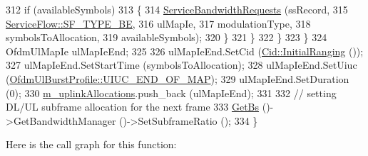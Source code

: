 \begin{DoxyCode}
312               \textcolor{keywordflow}{if} (availableSymbols)
313                 \{
314                   \hyperlink{classns3_1_1UplinkSchedulerSimple_ad420cfa439ba7c319fab7dd0db299408}{ServiceBandwidthRequests} (ssRecord,
315                                             \hyperlink{classns3_1_1ServiceFlow_a7990ba10be1e098328fd1e6382a26235af93a8bd8fce654e688f957f6f362e5c7}{ServiceFlow::SF\_TYPE\_BE},
316                                             ulMapIe,
317                                             modulationType,
318                                             symbolsToAllocation,
319                                             availableSymbols);
320                 \}
321             \}
322         \}
323     \}
324   OfdmUlMapIe ulMapIeEnd;
325 
326   ulMapIeEnd.SetCid (\hyperlink{classns3_1_1Cid_a5c204ab0df783c7594c764bae1611436}{Cid::InitialRanging} ());
327   ulMapIeEnd.SetStartTime (symbolsToAllocation);
328   ulMapIeEnd.SetUiuc (\hyperlink{classns3_1_1OfdmUlBurstProfile_ae528783c4b3c6700ff49dfd7a555cb3dabef491e8d426af16beba1541b947b7e9}{OfdmUlBurstProfile::UIUC\_END\_OF\_MAP});
329   ulMapIeEnd.SetDuration (0);
330   \hyperlink{classns3_1_1UplinkSchedulerSimple_a81eb434b3223cb1a0641c5cd82b04009}{m\_uplinkAllocations}.push\_back (ulMapIeEnd);
331 
332   \textcolor{comment}{// setting DL/UL subframe allocation for the next frame}
333   \hyperlink{classns3_1_1UplinkScheduler_afe61b7de71d92d2dff1b135744a6ff7e}{GetBs} ()->GetBandwidthManager ()->SetSubframeRatio ();
334 \}
\end{DoxyCode}


Here is the call graph for this function\+:


